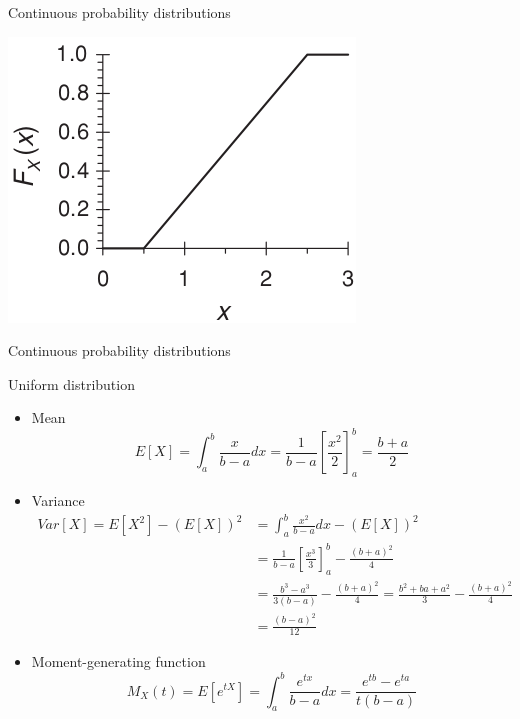 \documentclass[8pt]{beamer}
\renewcommand{\emph}[1]{\textcolor{myorange}{#1}}
\begin{document}
\begin{frame}{Continuous probability distributions}
\begin{minipage}{0.49\textwidth}
\centering
\includegraphics[width=0.8\linewidth]{fi422.png} %
\end{minipage}

\end{frame}

\begin{frame}{Continuous probability distributions}
    \begin{block}{\alert{Uniform} distribution}

        \begin{itemize}
            \item \emph{Mean}
                \[
                    E[X] = \int_a^b \frac{x}{b-a} dx = \frac{1}{b-a} \left[ \frac{x^2}{2} \right]_a^b = \frac{b+a}{2}
                \]
            \item \emph{Variance}
         \begin{align*}
             \displaystyle
             Var[X] = E[X^2] - \left( E[X] \right)^2 &= \int_a^b \frac{x^2}{b-a} dx - \left( E[X] \right)^2  \\
                                                     &= \frac{1}{b-a} \left[ \frac{x^3}{3} \right]_a^b -  \frac{(b+a)^2}{4} \\
                                                     &= \frac{b^3 - a^3}{3(b-a)} - \frac{(b+a)^2}{4} = \frac{b^2 + ba + a^2}{3} - \frac{(b+a)^2}{4}\\
                                                     &= \frac{(b-a)^2}{12}
        \end{align*}
    \item \emph{Moment-generating function}
\[
    M_X (t) = E \left[e^{tX} \right] = \int_a^b \frac{e^{tx}}{b-a} dx = \frac{e^{tb} - e^{ta}}{t(b-a)}
\]

        \end{itemize}
    \end{block}
\end{frame}
\end{document}
